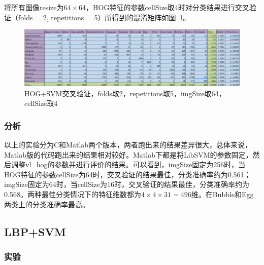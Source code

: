 \documentclass[12pt]{article}
\begin{document}
\begin{enumerate}
将所有图像resize为$64 \times 64$，HOG特征的参数cellSize取4时对分类结果进行交叉验证（folds = 2, repetitions = 5）所得到的混淆矩阵如图~\ref{fig: HOG-SVM-2-folds-5-repetitions-4-64}。
\begin{figure}[!ht]
\centering
\includegraphics[width=1.0\linewidth]{HOG-SVM-2-folds-5-repetitions-4-64}
\caption{HOG+SVM交叉验证，folds取2，repetitions取5，imgSize取64，cellSize取4}
\label{fig: HOG-SVM-2-folds-5-repetitions-4-64}
\end{figure}

\end{enumerate}

\subsubsection{分析}

以上的实验分为C和Matlab两个版本，两者跑出来的结果差异很大，总体来说，Matlab版的代码跑出来的结果相对较好。Matlab下都是将LibSVM的参数固定，然后调整vl\_hog的参数并进行评价的结果。可以看到，imgSize固定为256时，当HOG特征的参数cellSize为64时，交叉验证的结果最佳，分类准确率约为0.561；imgSize固定为64时，当cellSize为16时，交叉验证的结果最佳，分类准确率约为0.568。两种最佳分类情况下的特征维数都为$4\times 4\times 31=496$维。在Bubble和Egg两类上的分类准确率最高。

\subsection{LBP+SVM}

\subsubsection{实验}
\end{document}
